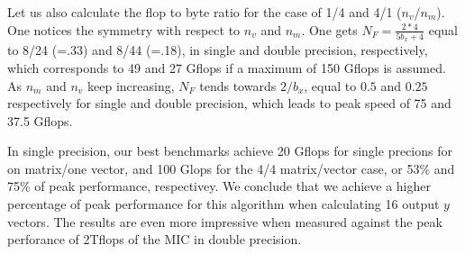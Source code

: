 Let us also calculate the flop to byte ratio for the case of 1/4 and 4/1 ($n_v$/$n_m$). One notices the symmetry with respect to $n_v$ and $n_m$. 
One gets $N_F = \frac{2*4}{5 b_x + 4}$ equal to 8/24 (=.33) and 8/44 (=.18), in single and double precision, respectively, which corresponds to 49 and 27 Gflops if a maximum of 150 Gflops is assumed.
As $n_m$ and $n_v$ keep increasing, $N_F$ tends towards $2/b_x$, equal to $0.5$ and $0.25$ respectively for single and double precision, which leads to peak speed of 75 and 37.5 Gflops.

In single precision, our best benchmarks achieve 20 Gflops for single precions for on matrix/one vector, and 100 Glops for the 4/4 matrix/vector case, or 53\% and 75\% of peak performance, respectivey. We conclude that we achieve a higher percentage of peak performance for this algorithm when calculating 16 output $y$ vectors. The results are even more impressive when measured against the peak perforance of 2Tflops of the MIC in double precision.
